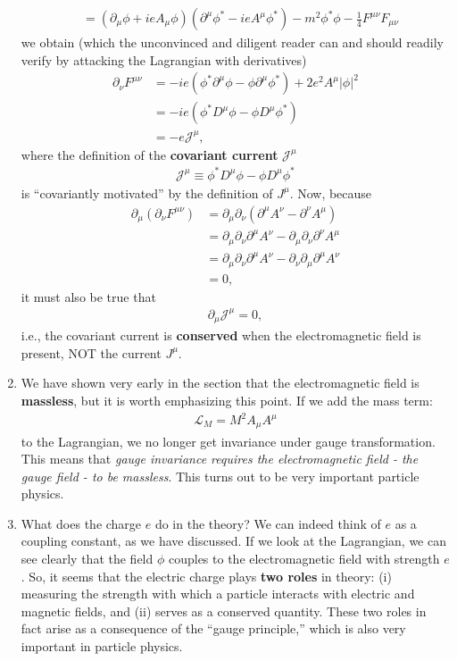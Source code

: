 \documentclass{book}
\numberwithin{equation}{section}
\theoremstyle{definition}
\newcommand{\p}{\partial}
\newcommand{\lag}{\mathcal{L}}
\begin{document}
\begin{enumerate}
\begin{align}
	&= (\p_\mu\phi + ieA_\mu\phi)(\p^\mu\phi^* - ieA^\mu\phi^*) - m^2\phi^*\phi - \frac{1}{4}F^{\mu\nu}F_{\mu\nu}
	\end{align}
	we obtain (which the unconvinced and diligent reader can and should readily verify by attacking the Lagrangian with derivatives)
	\begin{align}
	\p_\nu F^{\mu\nu} &= -ie(\phi^*\p^\mu\phi - \phi\p^\mu\phi^*) + 2e^2A^\mu\vert \phi\vert^2\\
	&= -ie(\phi^* D^\mu\phi - \phi D^\mu\phi^*)\\
	&= -e\mathcal{J}^\mu,
	\end{align}
	where the definition of the \textbf{covariant current} $\mathcal{J}^\mu$
	\begin{align}
	\mathcal{J}^\mu \equiv \phi^* D^\mu\phi - \phi D^\mu\phi^*
	\end{align} is ``covariantly motivated'' by the definition of $J^\mu$. Now, because
	\begin{align}
	\p_\mu (\p_\nu F^{\mu\nu}) &= \p_\mu\p_\nu (\p^\mu A^\nu - \p^\nu A^\mu)\\
	&= \p_\mu\p_\nu\p^\mu A^\nu - \p_\mu\p_\nu\p^\nu A^\mu\\
	&= \p_\mu\p_\nu\p^\mu A^\nu - \p_\nu\p_\mu\p^\mu A^\nu\\
	&= 0,
	\end{align}
	it must also be true that
	\begin{align}
	\p_\mu \mathcal{J}^\mu = 0,
	\end{align}
	i.e., the covariant current is \textbf{conserved} when the electromagnetic field is present, NOT the current $J^\mu$.
	\item We have shown very early in the section that the electromagnetic field is \textbf{massless}, but it is worth emphasizing this point. If we add the mass term:
	\begin{align}
	\lag_M = M^2A_\mu A^\mu
	\end{align}
	to the Lagrangian, we no longer get invariance under gauge transformation. This means that \textit{gauge invariance requires the electromagnetic field - the gauge field - to be massless}. This turns out to be very important particle physics. 
	\item What does the charge $e$ do in the theory? We can indeed think of $e$ as a coupling constant, as we have discussed. If we look at the Lagrangian, we can see clearly that the field $\phi$ couples to the electromagnetic field with strength $e$. So, it seems that the electric charge plays \textbf{two roles} in theory: (i) measuring the strength with which a particle interacts with electric and magnetic fields, and (ii) serves as a conserved quantity. These two roles in fact arise as a consequence of the ``gauge principle,'' which is also very important in particle physics. 
\end{enumerate}
\end{document}
